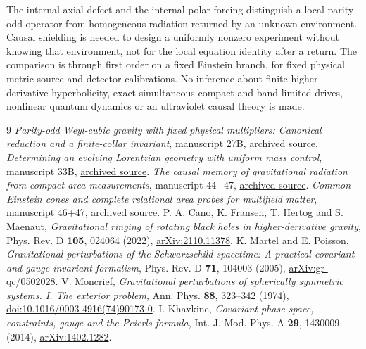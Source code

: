 \documentclass[11pt]{article}
\begin{document}
The internal axial defect and the internal polar forcing distinguish a local parity-odd operator from homogeneous radiation returned by an unknown environment. Causal shielding is needed to design a uniformly nonzero experiment without knowing that environment, not for the local equation identity after a return. The comparison is through first order on a fixed Einstein branch, for fixed physical metric source and detector calibrations. No inference about finite higher-derivative hyperbolicity, exact simultaneous compact and band-limited drives, nonlinear quantum dynamics or an ultraviolet causal theory is made.

\begin{thebibliography}{9}
 \emph{Parity-odd Weyl-cubic gravity with fixed physical multipliers: Canonical reduction and a finite-collar invariant}, manuscript 27B, \href{https://github.com/g3173028019-beep/ai-automated-quantum-gravity-research/tree/main/papers/27b-weyl-cubic-finite-collar}{archived source}.
 \emph{Determining an evolving Lorentzian geometry with uniform mass control}, manuscript 33B, \href{https://github.com/g3173028019-beep/ai-automated-quantum-gravity-research/tree/main/papers/33b-active-evolving-lorentzian-geometry}{archived source}.
 \emph{The causal memory of gravitational radiation from compact area measurements}, manuscript 44+47, \href{https://github.com/g3173028019-beep/ai-automated-quantum-gravity-research/tree/main/papers/44-47-gravitational-radiation-memory}{archived source}.
 \emph{Common Einstein cones and complete relational area probes for multifield matter}, manuscript 46+47, \href{https://github.com/g3173028019-beep/ai-automated-quantum-gravity-research/tree/main/papers/46-47-common-cones-and-area-probes}{archived source}.
 P. A. Cano, K. Fransen, T. Hertog and S. Maenaut, \emph{Gravitational ringing of rotating black holes in higher-derivative gravity}, Phys. Rev. D \textbf{105}, 024064 (2022), \href{https://arxiv.org/abs/2110.11378}{arXiv:2110.11378}.
 K. Martel and E. Poisson, \emph{Gravitational perturbations of the Schwarzschild spacetime: A practical covariant and gauge-invariant formalism}, Phys. Rev. D \textbf{71}, 104003 (2005), \href{https://arxiv.org/abs/gr-qc/0502028}{arXiv:gr-qc/0502028}.
 V. Moncrief, \emph{Gravitational perturbations of spherically symmetric systems. I. The exterior problem}, Ann. Phys. \textbf{88}, 323--342 (1974), \href{https://doi.org/10.1016/0003-4916(74)90173-0}{doi:10.1016/0003-4916(74)90173-0}.
 I. Khavkine, \emph{Covariant phase space, constraints, gauge and the Peierls formula}, Int. J. Mod. Phys. A \textbf{29}, 1430009 (2014), \href{https://arxiv.org/abs/1402.1282}{arXiv:1402.1282}.
\end{thebibliography}
\end{document}
